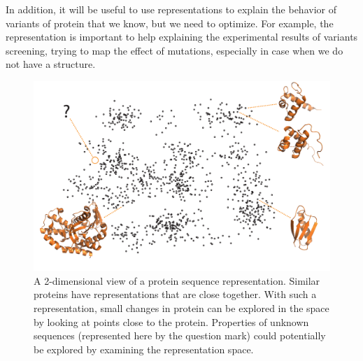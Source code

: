 In addition, it will be useful to use representations to explain the behavior of variants of protein that we know, but we need to optimize. For example, the representation is important to help explaining the experimental results of variants screening, trying to map the effect of mutations, especially in case when we do not have a structure.

\begin{figure}[ht]
    \centering
    \includegraphics[width=\textwidth]{figures/figure.pdf}
    \caption{A 2-dimensional view of a protein sequence representation. Similar proteins have representations that are close together. With such a representation, small changes in protein can be explored in the space by looking at points close to the protein. Properties of unknown sequences (represented here by the question mark) could potentially be explored by examining the representation space.}
    \label{fig:latentSpace}
\end{figure}




